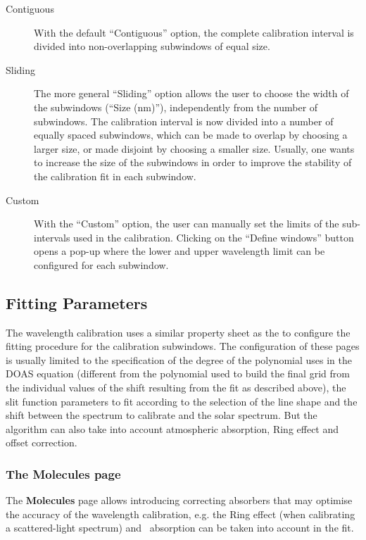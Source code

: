 \begin{description}
\item[Contiguous] With the default ``Contiguous'' option, the complete
  calibration interval is divided into non-overlapping subwindows of
  equal size.
\item[Sliding] The more general ``Sliding'' option allows the user to
  choose the width of the subwindows (``Size (nm)''), independently
  from the number of subwindows.  The calibration interval is now
  divided into a number of equally spaced subwindows, which can be
  made to overlap by choosing a larger size, or made disjoint by
  choosing a smaller size.  Usually, one wants to increase the size of
  the subwindows in order to improve the stability of the calibration
  fit in each subwindow.
\item[Custom] With the ``Custom'' option, the user can manually set
  the limits of the sub-intervals used in the calibration.  Clicking on
  the ``Define windows'' button opens a pop-up where the lower and
  upper wavelength limit can be configured for each subwindow.
\end{description}

\subsection{Fitting Parameters}
The wavelength calibration uses a similar property sheet as the
 to configure the fitting procedure for
the calibration subwindows.  The configuration of these pages is
usually limited to the specification of the degree of the polynomial
uses in the DOAS equation (different from the polynomial used to build
the final grid from the individual values of the shift resulting from
the fit as described above), the slit function parameters to fit
according to the selection of the line shape and the shift between the
spectrum to calibrate and the solar spectrum. But the algorithm can
also take into account atmospheric absorption, Ring effect and offset
correction.

\subsubsection{The Molecules page}
The \textbf{Molecules} page allows introducing correcting absorbers that may optimise the accuracy of the wavelength calibration, e.g. the Ring effect (when calibrating a scattered-light spectrum) and \ozone~absorption can be taken into account in the fit.

